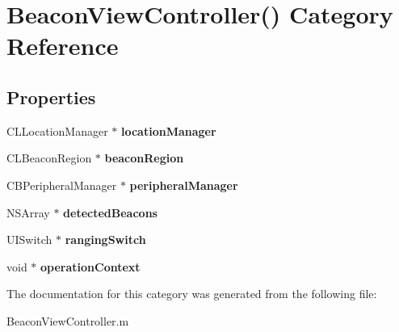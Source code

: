 \hypertarget{category_beacon_view_controller_07_08}{}\section{Beacon\+View\+Controller() Category Reference}
\label{category_beacon_view_controller_07_08}
\subsection*{Properties}
\begin{DoxyCompactItemize}
\item 
\hypertarget{category_beacon_view_controller_07_08_a5d85a26337748cf4f063a533ab01a3f8}{}C\+L\+Location\+Manager $\ast$ {\bfseries location\+Manager}\label{category_beacon_view_controller_07_08_a5d85a26337748cf4f063a533ab01a3f8}

\item 
\hypertarget{category_beacon_view_controller_07_08_a2cc63d4140e6ec379df7357bc7bd04f1}{}C\+L\+Beacon\+Region $\ast$ {\bfseries beacon\+Region}\label{category_beacon_view_controller_07_08_a2cc63d4140e6ec379df7357bc7bd04f1}

\item 
\hypertarget{category_beacon_view_controller_07_08_a73b87fab61673b3d597e472076f064c4}{}C\+B\+Peripheral\+Manager $\ast$ {\bfseries peripheral\+Manager}\label{category_beacon_view_controller_07_08_a73b87fab61673b3d597e472076f064c4}

\item 
\hypertarget{category_beacon_view_controller_07_08_a2002b39c2b678c343f2f622b25b27e06}{}N\+S\+Array $\ast$ {\bfseries detected\+Beacons}\label{category_beacon_view_controller_07_08_a2002b39c2b678c343f2f622b25b27e06}

\item 
\hypertarget{category_beacon_view_controller_07_08_a0b9ecc9bde1f59fe377c9346ab48e1bc}{}U\+I\+Switch $\ast$ {\bfseries ranging\+Switch}\label{category_beacon_view_controller_07_08_a0b9ecc9bde1f59fe377c9346ab48e1bc}

\item 
\hypertarget{category_beacon_view_controller_07_08_aded3b4994589bb288ae1bb83111e4e57}{}void $\ast$ {\bfseries operation\+Context}\label{category_beacon_view_controller_07_08_aded3b4994589bb288ae1bb83111e4e57}

\end{DoxyCompactItemize}


The documentation for this category was generated from the following file\+:\begin{DoxyCompactItemize}
\item 
Beacon\+View\+Controller.\+m\end{DoxyCompactItemize}
